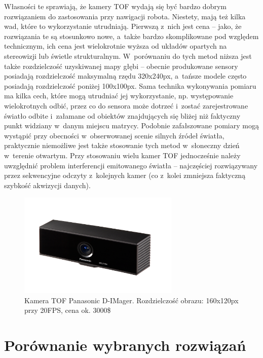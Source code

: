 Własności te sprawiają, że kamery TOF wydają się być bardzo dobrym rozwiązaniem
do zastosowania przy nawigacji robota. Niestety, mają też kilka wad, które to
wykorzystanie utrudniają. Pierwszą z~nich jest cena -- jako, że rozwiązania te są
stosunkowo nowe, a~także bardzo skomplikowane pod względem technicznym, ich cena
jest wielokrotnie wyższa od układów opartych na stereowizji lub świetle
strukturalnym. W~porównaniu do tych metod niższa jest także rozdzielczość
uzyskiwanej mapy głębi -- obecnie produkowane sensory posiadają rozdzielczość
maksymalną rzędu 320x240px, a~tańsze modele często posiadają rozdzielczość
poniżej 100x100px. Sama technika wykonywania pomiaru ma kilka cech, które mogą
utrudniać jej wykorzystanie, np. występowanie wielokrotnych odbić, przez co
do sensora może dotrzeć i~zostać zarejestrowane światło odbite i~załamane od
obiektów znajdujących się bliżej niż faktyczny punkt widziany w~danym miejscu
matrycy. Podobnie zafałszowane pomiary mogą wystąpić przy obecności
w~obserwowanej scenie silnych źródeł światła, praktycznie niemożliwe jest także
stosowanie tych metod w~słoneczny dzień w~terenie otwartym. Przy stosowaniu
wielu kamer TOF jednocześnie należy uwzględnić problem interferencji emitowanego
światła -- najczęściej rozwiązywany przez sekwencyjne odczyty z~kolejnych kamer
(co z~kolei zmniejsza faktyczną szybkość akwizycji danych).

\begin{figure}[h!]
\centering
\includegraphics[height=5cm]{../../Common/img/dimager}
\caption[Kamera TOF Panasonic D-IMager]{Kamera TOF Panasonic D-IMager.
Rozdzielczość obrazu: 160x120px przy 20FPS, cena ok. 3000\$}
\label{fig:dimager}
\end{figure}

\section{Porównanie wybranych rozwiązań}

